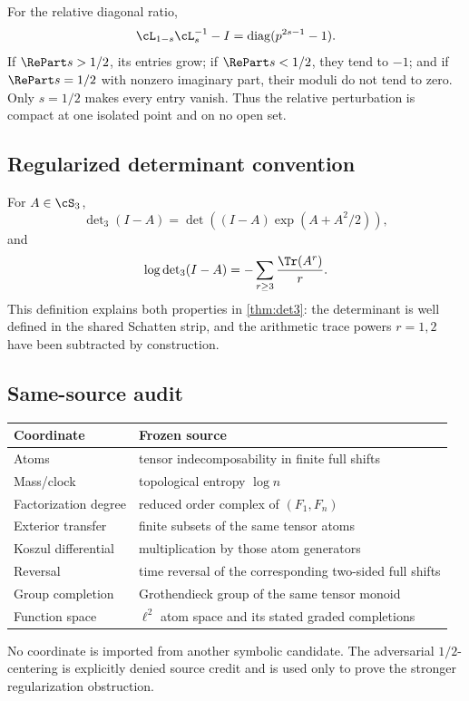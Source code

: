 For the relative diagonal ratio,
\[
 \cL_{1-s}\cL_s^{-1}-I
 =\operatorname{diag}(p^{2s-1}-1).
\]
If $\RePart s>1/2$, its entries grow; if $\RePart s<1/2$, they tend to
$-1$; and if $\RePart s=1/2$ with nonzero imaginary part, their moduli do
not tend to zero. Only $s=1/2$ makes every entry vanish. Thus the relative
perturbation is compact at one isolated point and on no open set.

\subsection{Regularized determinant convention}

For $A\in\cS_3$,
\[
 \det\nolimits_3(I-A)
 =\det\!\left((I-A)\exp(A+A^2/2)\right),
\]
and
\[
 \log\det\nolimits_3(I-A)
 =-\sum_{r\ge3}\frac{\Tr(A^r)}r.
\]
This definition explains both properties in \cref{thm:det3}: the determinant
is well defined in the shared Schatten strip, and the arithmetic trace
powers $r=1,2$ have been subtracted by construction.

\subsection{Same-source audit}

\begin{center}
\small
\begin{tabularx}{0.96\textwidth}{L{0.25\textwidth}X}
\toprule
Coordinate & Frozen source \\
\midrule
Atoms & tensor indecomposability in finite full shifts \\
Mass/clock & topological entropy $\log n$ \\
Factorization degree & reduced order complex of $(F_1,F_n)$ \\
Exterior transfer & finite subsets of the same tensor atoms \\
Koszul differential & multiplication by those atom generators \\
Reversal & time reversal of the corresponding two-sided full shifts \\
Group completion & Grothendieck group of the same tensor monoid \\
Function space & $\ell^2$ atom space and its stated graded completions \\
\bottomrule
\end{tabularx}
\end{center}

No coordinate is imported from another symbolic candidate. The adversarial
$1/2$-centering is explicitly denied source credit and is used only to prove
the stronger regularization obstruction.

